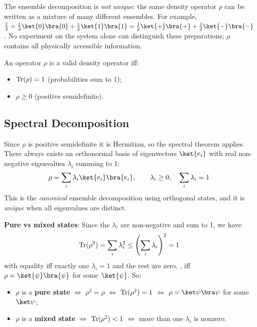 \documentclass[oneside]{academica}
\begin{document}
\begin{note}
  The ensemble decomposition is \emph{not unique}: the same density operator $\rho$ can be written as a mixture of many different ensembles.
  For example, $\frac{I}{2}=\frac12\ket{0}\bra{0}+\frac12\ket{1}\bra{1} =\frac12\ket{+}\bra{+}+\frac12\ket{-}\bra{-}$.
  No experiment on the system alone can distinguish these preparations; $\rho$ contains all physically accessible information.
\end{note}

\begin{theorem*}[Characterisation]
  An operator $\rho$ is a valid density operator iff:
  \begin{itemize}
    \item $\operatorname{Tr}(\rho)=1$ \quad(probabilities sum to 1);
    \item $\rho\ge 0$ \quad(positive semidefinite).
  \end{itemize}
\end{theorem*}

\subsection{Spectral Decomposition}

Since $\rho$ is positive semidefinite it is Hermitian, so the spectral theorem applies.
There always exists an orthonormal basis of eigenvectors $\ket{e_i}$ with real non-negative eigenvalues $\lambda_i$ summing to 1:
\begin{equation*}
  \rho = \sum_i \lambda_i \ket{e_i}\bra{e_i}, \qquad \lambda_i \ge 0,\quad \sum_i\lambda_i = 1
\end{equation*}
This is the \emph{canonical} ensemble decomposition using orthogonal states, and it is \emph{unique} when all eigenvalues are distinct.

\textbf{Pure vs mixed states}: Since the $\lambda_i$ are non-negative and sum to 1, we have
\begin{equation*}
  \operatorname{Tr}(\rho^2)=\sum_i\lambda_i^2 \le \left(\sum_i\lambda_i\right)^2 = 1
\end{equation*}
with equality iff exactly one $\lambda_i=1$ and the rest are zero, \ie, iff $\rho=\ket{\psi}\bra{\psi}$ for some $\ket{\psi}$.
So:
\begin{itemize}
  \item $\rho$ is a \textbf{pure state} $\iff$ $\rho^2=\rho$ $\iff$ $\operatorname{Tr}(\rho^2)=1$ $\iff$ $\rho=\ket\psi\bra\psi$ for some $\ket\psi$;
  \item $\rho$ is a \textbf{mixed state} $\iff$ $\operatorname{Tr}(\rho^2)<1$ $\iff$ more than one $\lambda_i$ is nonzero.
\end{itemize}
\end{document}
